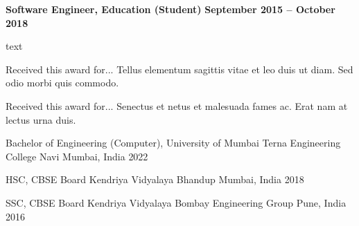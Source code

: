 \documentclass[10pt, a4paper]{cvhari}
\begin{document}
\smallskip
\divider
\smallskip

    \textbf{Software Engineer, Education (Student)} \hfill \textbf{September 2015 -- October 2018}

    \vspace{0.2em}
    \par
        text
    \par



\medskip

    \bigskip
    
    {Received this award for... Tellus elementum sagittis vitae et leo duis ut diam. Sed odio morbi quis commodo.}\par
    
    \smallskip 
    \dividergray
    \smallskip
    
    {Received this award for... Senectus et netus et malesuada fames ac. Erat nam at lectus urna duis.}\par
    \medskip

\medskip


\medskip
    \education
        {Bachelor of Engineering (Computer), University of Mumbai}
        {Terna Engineering College}
        {Navi Mumbai, India}
        {2022}
        \par
        \dividergray
     
        \education
        {HSC, CBSE Board}
        {Kendriya Vidyalaya Bhandup}
        {Mumbai, India}
        {2018}

        \par
        \dividergray

        \education
        {SSC, CBSE Board}
        {Kendriya Vidyalaya Bombay Engineering Group}
        {Pune, India}
        {2016}

        \par
        \dividergray
\end{document}
